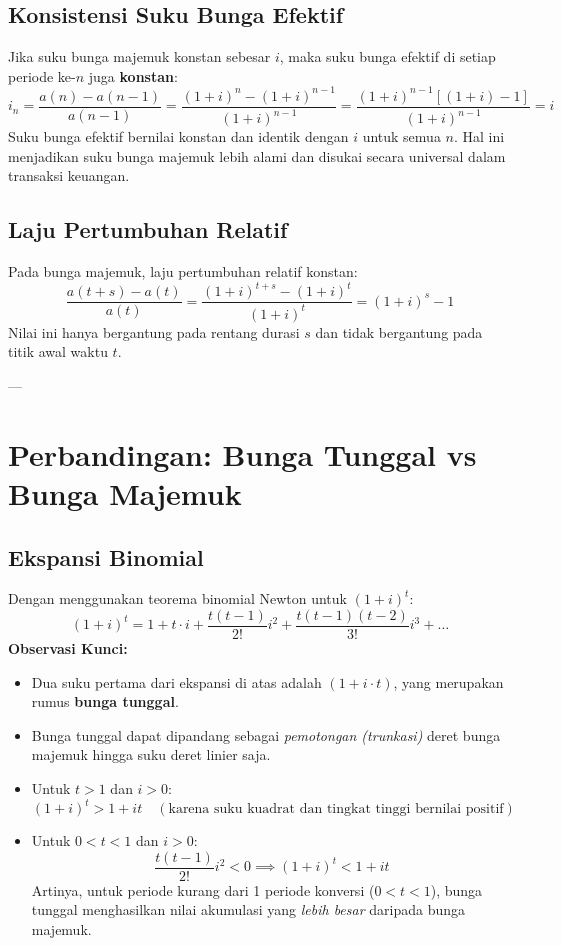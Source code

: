 \documentclass[11pt,a4paper]{article}
\begin{document}
\subsection{Konsistensi Suku Bunga Efektif}
Jika suku bunga majemuk konstan sebesar $i$, maka suku bunga efektif di setiap periode ke-$n$ juga \textbf{konstan}:
\begin{equation}
    i_n = \frac{a(n) - a(n-1)}{a(n-1)} = \frac{(1 + i)^n - (1 + i)^{n-1}}{(1 + i)^{n-1}} = \frac{(1+i)^{n-1}[(1+i) - 1]}{(1+i)^{n-1}} = i
\end{equation}
Suku bunga efektif bernilai konstan dan identik dengan $i$ untuk semua $n$. Hal ini menjadikan suku bunga majemuk lebih alami dan disukai secara universal dalam transaksi keuangan.

\subsection{Laju Pertumbuhan Relatif}
Pada bunga majemuk, laju pertumbuhan relatif konstan:
\begin{equation}
    \frac{a(t+s) - a(t)}{a(t)} = \frac{(1+i)^{t+s} - (1+i)^t}{(1+i)^t} = (1+i)^s - 1
\end{equation}
Nilai ini hanya bergantung pada rentang durasi $s$ dan tidak bergantung pada titik awal waktu $t$.

---

\section{Perbandingan: Bunga Tunggal vs Bunga Majemuk}

\subsection{Ekspansi Binomial}
Dengan menggunakan teorema binomial Newton untuk $(1 + i)^t$:
\begin{equation}
    (1 + i)^t = 1 + t \cdot i + \frac{t(t-1)}{2!} i^2 + \frac{t(t-1)(t-2)}{3!} i^3 + \dots
\end{equation}
\textbf{Observasi Kunci:}
\begin{itemize}
    \item Dua suku pertama dari ekspansi di atas adalah $(1 + i \cdot t)$, yang merupakan rumus \textbf{bunga tunggal}.
    \item Bunga tunggal dapat dipandang sebagai \emph{pemotongan (trunkasi)} deret bunga majemuk hingga suku deret linier saja.
    \item Untuk $t > 1$ dan $i > 0$:
    \begin{equation*}
        (1+i)^t > 1 + it \quad (\text{karena suku kuadrat dan tingkat tinggi bernilai positif})
    \end{equation*}
    \item Untuk $0 < t < 1$ dan $i > 0$:
    \begin{equation*}
        \frac{t(t-1)}{2!} i^2 < 0 \implies (1+i)^t < 1 + it
    \end{equation*}
    Artinya, untuk periode kurang dari 1 periode konversi ($0 < t < 1$), bunga tunggal menghasilkan nilai akumulasi yang \emph{lebih besar} daripada bunga majemuk.
\end{itemize}
\end{document}

